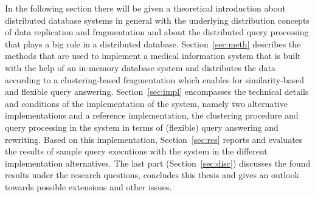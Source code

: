 In the following section there will be given a theoretical introduction about distributed database systems in general with the underlying distribution 
concepts of data replication and fragmentation and about the distributed query processing that plays a big role in a distributed database. 
Section~\ref{sec:meth} describes the methods that are used to implement a medical information system that is built with the help of an in-memory database
system and distributes the data according to a clustering-based fragmentation which enables for similarity-based and flexible query answering.
Section~\ref{sec:impl} encompasses the technical details and conditions of the implementation of the system, namely two alternative implementations and
a reference implementation, the clustering procedure and query processing in the system in terms of (flexible) query answering and rewriting. Based on this
implementation, Section~\ref{sec:res} reports and evaluates the results of sample query executions with the system in the different implementation
alternatives. The last part (Section~\ref{sec:disc}) discusses the found results under the research questions, concludes this thesis and gives an outlook towards
possible extensions and other issues.
